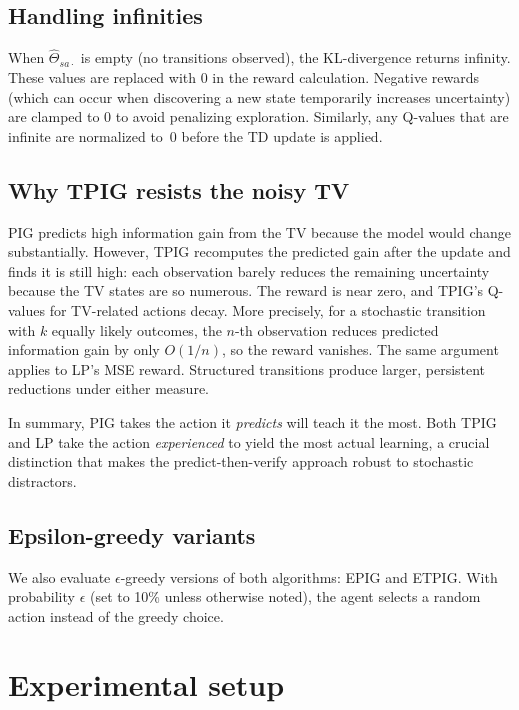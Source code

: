 \documentclass[letterpaper]{article}
\begin{document}
\subsection{Handling infinities}

When $\hat{\Theta}_{sa\cdot}$ is empty (no transitions observed),
the KL-divergence returns infinity.  These values are replaced with 0
in the reward calculation.  Negative rewards (which can occur when
discovering a new state temporarily increases uncertainty) are clamped
to 0 to avoid penalizing exploration.  Similarly, any Q-values that
are infinite are normalized to~0 before the TD update is applied.

\subsection{Why TPIG resists the noisy TV}

PIG predicts high information gain from the TV because the model
would change substantially.  However, TPIG recomputes the predicted
gain after the update and finds it is still high: each observation
barely reduces the remaining uncertainty because the TV states are so
numerous.  The reward is near zero, and TPIG's Q-values for
TV-related actions decay.  More precisely, for a stochastic transition
with $k$ equally likely outcomes, the $n$-th observation reduces
predicted information gain by only $O(1/n)$, so the reward vanishes.
The same argument applies to LP's MSE reward.  Structured transitions
produce larger, persistent reductions under either measure.

In summary, PIG takes the action it \emph{predicts} will teach it the
most.  Both TPIG and LP take the action \emph{experienced} to yield
the most actual learning, a crucial distinction that makes the
predict-then-verify approach robust to stochastic distractors.

\subsection{Epsilon-greedy variants}

We also evaluate $\epsilon$-greedy versions of both algorithms:
EPIG and ETPIG.  With probability $\epsilon$ (set to 10\% unless
otherwise noted), the agent selects a random action instead of the
greedy choice.

\section{Experimental setup}
\end{document}
